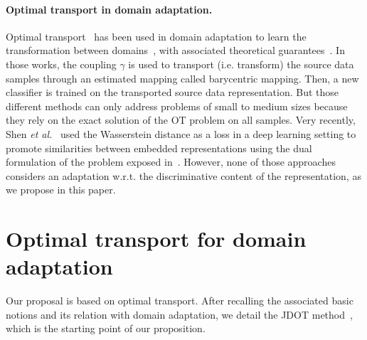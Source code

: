 \documentclass[runningheads]{llncs}
\begin{document}
\paragraph{Optimal transport in domain adaptation.} Optimal transport~\cite{monge1781memoire,Kantorovich42,Villani09} has been used in domain adaptation to learn the transformation between domains~\cite{Cou17,Cou14,Per16}, with associated theoretical guarantees~\cite{redko2017}. In those works, the coupling $\gamma$ is used to transport (i.e. transform) the source data samples through an estimated mapping called barycentric mapping. Then, a new classifier is trained on the transported source data representation. But those different methods can only address problems of small to medium sizes because they rely on the exact solution of the OT problem on all samples. 
Very recently, Shen {\em et al.}~\cite{Shen2018} used the Wasserstein distance as a loss in a deep learning setting to promote similarities between embedded representations using the dual formulation of the problem exposed in~\cite{arjovsky17}. However, none of those approaches considers an adaptation w.r.t. the discriminative content of the representation, as we propose in this paper.


\section{Optimal transport for domain adaptation}
\label{sec:ot}

Our proposal is based on optimal transport. After recalling the associated basic notions and its relation with domain adaptation, we detail the JDOT method~\cite{courty2017joint}, which is the starting point of our proposition.
 
\end{document}
